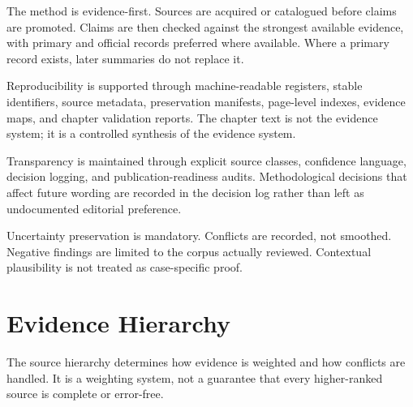 The method is evidence-first. Sources are acquired or catalogued before claims are promoted. Claims are then checked against the strongest available evidence, with primary and official records preferred where available. Where a primary record exists, later summaries do not replace it.

Reproducibility is supported through machine-readable registers, stable identifiers, source metadata, preservation manifests, page-level indexes, evidence maps, and chapter validation reports. The chapter text is not the evidence system; it is a controlled synthesis of the evidence system.

Transparency is maintained through explicit source classes, confidence language, decision logging, and publication-readiness audits. Methodological decisions that affect future wording are recorded in the decision log rather than left as undocumented editorial preference.

Uncertainty preservation is mandatory. Conflicts are recorded, not smoothed. Negative findings are limited to the corpus actually reviewed. Contextual plausibility is not treated as case-specific proof.

\section{Evidence Hierarchy}

The source hierarchy determines how evidence is weighted and how conflicts are handled. It is a weighting system, not a guarantee that every higher-ranked source is complete or error-free.

